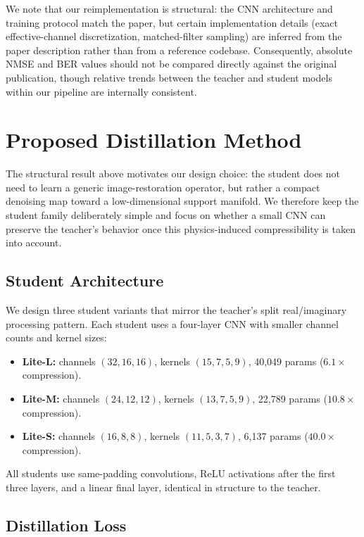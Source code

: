 \documentclass[conference]{IEEEtran}
\begin{document}
We note that our reimplementation is structural: the CNN architecture and training protocol match the paper, but certain implementation details (exact effective-channel discretization, matched-filter sampling) are inferred from the paper description rather than from a reference codebase. Consequently, absolute NMSE and BER values should not be compared directly against the original publication, though relative trends between the teacher and student models within our pipeline are internally consistent.

\section{Proposed Distillation Method}
\label{sec:distill}

The structural result above motivates our design choice: the student does not need to learn a generic image-restoration operator, but rather a compact denoising map toward a low-dimensional support manifold. We therefore keep the student family deliberately simple and focus on whether a small CNN can preserve the teacher's behavior once this physics-induced compressibility is taken into account.

\subsection{Student Architecture}

We design three student variants that mirror the teacher's split real/imaginary processing pattern. Each student uses a four-layer CNN with smaller channel counts and kernel sizes:

\begin{itemize}
    \item \textbf{Lite-L:} channels $(32, 16, 16)$, kernels $(15, 7, 5, 9)$, 40,049 params ($6.1\times$ compression).
    \item \textbf{Lite-M:} channels $(24, 12, 12)$, kernels $(13, 7, 5, 9)$, 22,789 params ($10.8\times$ compression).
    \item \textbf{Lite-S:} channels $(16, 8, 8)$, kernels $(11, 5, 3, 7)$, 6,137 params ($40.0\times$ compression).
\end{itemize}

All students use same-padding convolutions, ReLU activations after the first three layers, and a linear final layer, identical in structure to the teacher.

\subsection{Distillation Loss}
\end{document}
